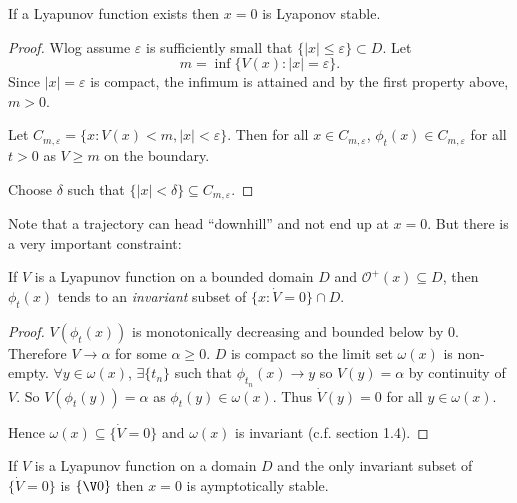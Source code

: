 \documentclass[a4paper]{article}
\begin{document}
\begin{theorem}
  If a Lyapunov function exists then \(x=0\) is Lyaponov stable.
\end{theorem}

\begin{proof}
  Wlog assume \(\varepsilon\) is sufficiently small that \(\{|x|\leq\varepsilon\} \subset D\). Let
  \[
    m = \inf \{V(x): |x| = \varepsilon\}.
  \]
  Since \(|x|=\varepsilon\) is compact, the infimum is attained and by the first property above, \(m>0\).

  Let \(C_{m,\varepsilon} = \{x: V(x)<m, |x| < \varepsilon \}\). Then for all \(x\in C_{m,\varepsilon}\), \(\phi_t(x) \in C_{m,\varepsilon}\) for all \(t>0\) as \(V\geq m\) on the boundary.

  Choose \(\delta\) such that \(\{|x|< \delta\} \subseteq C_{m,\varepsilon}\).
\end{proof}

Note that a trajectory can head ``downhill'' and not end up at \(x=0\). But there is a very important constraint:

\begin{theorem}
  If \(V\) is a Lyapunov function on a bounded domain \(D\) and \(\mathcal O^+(x) \subseteq D\), then \(\phi_t(x)\) tends to an \emph{invariant} subset of \(\{x: \dot{V} = 0\} \cap D\).
\end{theorem}

\begin{proof}
  \(V(\phi_t(x))\) is monotonically decreasing and bounded below by \(0\). Therefore \(V\to \alpha\) for some \(\alpha\geq0\). \(D\) is compact so the limit set \(\omega(x)\) is non-empty. \(\forall y\in \omega(x)\), \(\exists\{t_n\}\) such that \(\phi_{t_n}(x)\to y\) so \(V(y) = \alpha\) by continuity of \(V\). So \(V(\phi_t(y))=\alpha\) as \(\phi_t(y)\in \omega(x)\). Thus \(\dot{V}(y) = 0\) for all \(y\in\omega(x)\).

  Hence \(\omega(x) \subseteq \{ \dot{V} = 0\}\) and \(\omega(x)\) is invariant (c.f. section 1.4).
\end{proof}

\begin{corollary}
  If \(V\) is a Lyapunov function on a domain \(D\) and the only invariant subset of \(\{\dot{V}=0\}\) is \(\{\V 0\}\) then \(x=0\) is aymptotically stable.
\end{corollary}
\end{document}
